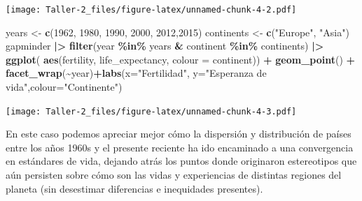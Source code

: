 \documentclass[
]{article}
\newenvironment{Shaded}{\begin{snugshade}}{\end{snugshade}}
\newcommand{\AttributeTok}[1]{\textcolor[rgb]{0.13,0.29,0.53}{#1}}
\newcommand{\DecValTok}[1]{\textcolor[rgb]{0.00,0.00,0.81}{#1}}
\newcommand{\FunctionTok}[1]{\textcolor[rgb]{0.13,0.29,0.53}{\textbf{#1}}}
\newcommand{\NormalTok}[1]{#1}
\newcommand{\OtherTok}[1]{\textcolor[rgb]{0.56,0.35,0.01}{#1}}
\newcommand{\SpecialCharTok}[1]{\textcolor[rgb]{0.81,0.36,0.00}{\textbf{#1}}}
\newcommand{\StringTok}[1]{\textcolor[rgb]{0.31,0.60,0.02}{#1}}
\begin{document}
\texttt{[image: Taller-2\_files/figure-latex/unnamed-chunk-4-2.pdf]}

\begin{Shaded}
\begin{Highlighting}[]
\NormalTok{years }\OtherTok{\textless{}{-}} \FunctionTok{c}\NormalTok{(}\DecValTok{1962}\NormalTok{, }\DecValTok{1980}\NormalTok{, }\DecValTok{1990}\NormalTok{, }\DecValTok{2000}\NormalTok{, }\DecValTok{2012}\NormalTok{,}\DecValTok{2015}\NormalTok{)}
\NormalTok{continents }\OtherTok{\textless{}{-}} \FunctionTok{c}\NormalTok{(}\StringTok{"Europe"}\NormalTok{, }\StringTok{"Asia"}\NormalTok{)}
\NormalTok{gapminder }\SpecialCharTok{|\textgreater{}}
  \FunctionTok{filter}\NormalTok{(year }\SpecialCharTok{\%in\%}\NormalTok{ years }\SpecialCharTok{\&}\NormalTok{ continent }\SpecialCharTok{\%in\%}\NormalTok{ continents) }\SpecialCharTok{|\textgreater{}}
  \FunctionTok{ggplot}\NormalTok{( }\FunctionTok{aes}\NormalTok{(fertility, life\_expectancy, }\AttributeTok{colour =}\NormalTok{ continent)) }\SpecialCharTok{+}
  \FunctionTok{geom\_point}\NormalTok{() }\SpecialCharTok{+}
  \FunctionTok{facet\_wrap}\NormalTok{(}\SpecialCharTok{\textasciitilde{}}\NormalTok{year)}\SpecialCharTok{+}\FunctionTok{labs}\NormalTok{(}\AttributeTok{x=}\StringTok{"Fertilidad"}\NormalTok{, }\AttributeTok{y=}\StringTok{"Esperanza de vida"}\NormalTok{,}\AttributeTok{colour=}\StringTok{"Continente"}\NormalTok{)}
\end{Highlighting}
\end{Shaded}

\texttt{[image: Taller-2\_files/figure-latex/unnamed-chunk-4-3.pdf]}

En este caso podemos apreciar mejor cómo la dispersión y distribución de
países entre los años 1960s y el presente reciente ha ido encaminado a
una convergencia en estándares de vida, dejando atrás los puntos donde
originaron estereotipos que aún persisten sobre cómo son las vidas y
experiencias de distintas regiones del planeta (sin desestimar
diferencias e inequidades presentes).
\end{document}
